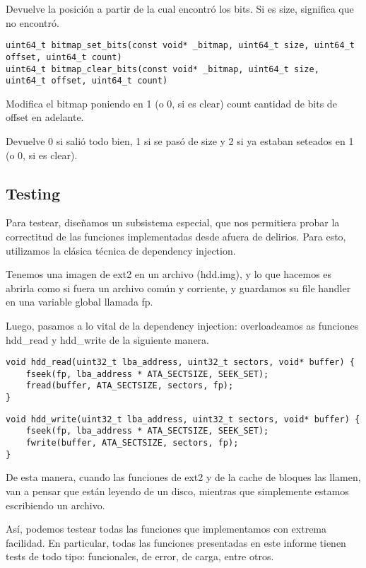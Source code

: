 Devuelve la posición a partir de la cual encontró los bits. Si es size, significa que no encontró.



\begin{lstlisting}[style=customc]
uint64_t bitmap_set_bits(const void* _bitmap, uint64_t size, uint64_t offset, uint64_t count)
uint64_t bitmap_clear_bits(const void* _bitmap, uint64_t size, uint64_t offset, uint64_t count)
\end{lstlisting}

Modifica el bitmap poniendo en 1 (o 0, si es clear) count cantidad de bits de offset en adelante.

Devuelve 0 si salió todo bien, 1 si se pasó de size y 2 si ya estaban seteados en 1 (o 0, si es clear).

\subsection{Testing}

Para testear, diseñamos un subsistema especial, que nos permitiera probar la correctitud de las funciones implementadas desde afuera de delirios. Para esto, utilizamos la clásica técnica de dependency injection.

Tenemos una imagen de ext2 en un archivo (hdd.img), y lo que hacemos es abrirla como si fuera un archivo común y corriente, y guardamos su file handler en una variable global llamada fp.

Luego, pasamos a lo vital de la dependency injection: overloadeamos as funciones hdd\_read y hdd\_write de la siguiente manera.


\begin{lstlisting}[style=customcmucho]
void hdd_read(uint32_t lba_address, uint32_t sectors, void* buffer) {
    fseek(fp, lba_address * ATA_SECTSIZE, SEEK_SET);
    fread(buffer, ATA_SECTSIZE, sectors, fp);
}
\end{lstlisting}

\begin{lstlisting}[style=customcmucho]
void hdd_write(uint32_t lba_address, uint32_t sectors, void* buffer) {
    fseek(fp, lba_address * ATA_SECTSIZE, SEEK_SET);
    fwrite(buffer, ATA_SECTSIZE, sectors, fp);
} 
\end{lstlisting}

De esta manera, cuando las funciones de ext2 y de la cache de bloques las llamen, van a pensar que están leyendo de un disco, mientras que simplemente estamos escribiendo un archivo.

Así, podemos testear todas las funciones que implementamos con extrema facilidad. En particular, todas las funciones presentadas en este informe tienen tests de todo tipo: funcionales, de error, de carga, entre otros.


